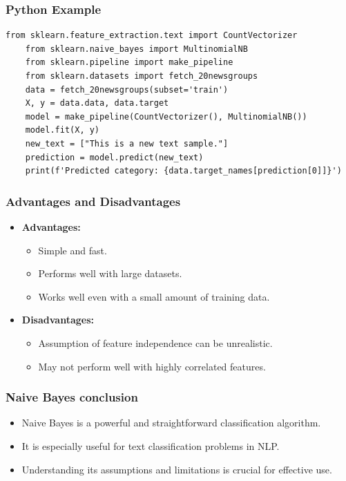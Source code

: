 \documentclass{beamer}
\begin{document}
\begin{frame}[fragile]
    \frametitle{Python Example}
    \begin{lstlisting}[style=pythonStyle, caption=Naive Bayes Classification Example]
    from sklearn.feature_extraction.text import CountVectorizer
    from sklearn.naive_bayes import MultinomialNB
    from sklearn.pipeline import make_pipeline
    from sklearn.datasets import fetch_20newsgroups
    data = fetch_20newsgroups(subset='train')
    X, y = data.data, data.target
    model = make_pipeline(CountVectorizer(), MultinomialNB())
    model.fit(X, y)
    new_text = ["This is a new text sample."]
    prediction = model.predict(new_text)
    print(f'Predicted category: {data.target_names[prediction[0]]}')
    \end{lstlisting}
\end{frame}

\begin{frame}
    \frametitle{Advantages and Disadvantages}
    \begin{itemize}
        \item \textbf{Advantages:}
        \begin{itemize}
            \item Simple and fast.
            \item Performs well with large datasets.
            \item Works well even with a small amount of training data.
        \end{itemize}
        \item \textbf{Disadvantages:}
        \begin{itemize}
            \item Assumption of feature independence can be unrealistic.
            \item May not perform well with highly correlated features.
        \end{itemize}
    \end{itemize}
\end{frame}

\begin{frame}
    \frametitle{Naive Bayes conclusion}
    \begin{itemize}
        \item Naive Bayes is a powerful and straightforward classification algorithm.
        \item It is especially useful for text classification problems in NLP.
        \item Understanding its assumptions and limitations is crucial for effective use.
    \end{itemize}
\end{frame}
\end{document}
